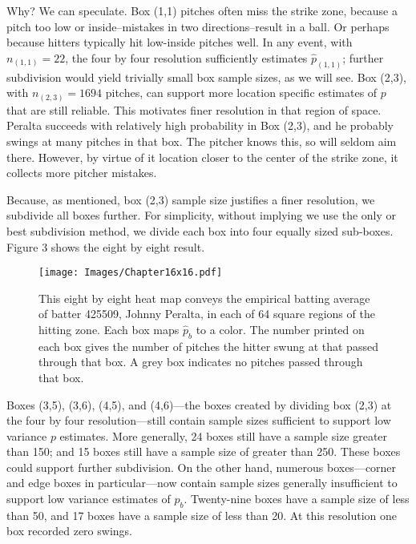 Why? We can speculate. Box (1,1) pitches often miss the strike zone, because a pitch too low or inside--mistakes in two directions--result in a ball. Or perhaps because hitters typically hit low-inside pitches well. In any event, with $n_{(1,1)}=22$, the four by four resolution sufficiently estimates $\hat{p}_{(1,1)}$; further subdivision would yield trivially small box sample sizes, as we will see. Box (2,3), with $n_{(2,3)} = 1694$ pitches, can support more location specific estimates of $p$ that are still reliable. This motivates finer resolution in that region of space. Peralta succeeds with relatively high probability in Box (2,3), and he probably swings at many pitches in that box. The pitcher knows this, so will seldom aim there. However, by virtue of it location closer to the center of the strike zone, it collects more pitcher mistakes.

Because, as mentioned, box (2,3) sample size justifies a finer resolution, we subdivide all boxes further. For simplicity, without implying we use the only or best subdivision method, we divide each box into four equally sized sub-boxes. Figure 3 shows the eight by eight result.
        \begin{figure}[H]
      	\centering
      	\texttt{[image: Images/Chapter16x16.pdf]} 
      	\caption{This eight by eight heat map conveys the empirical batting average of batter 425509, Johnny Peralta, in each of 64 square regions of the hitting zone. Each box maps $\hat{p}_{b}$ to a color. The number printed on each box gives the number of pitches the hitter swung at that passed through that box. A grey box indicates no pitches passed through that box.}
      	\end{figure} 

Boxes (3,5), (3,6), (4,5), and (4,6)---the boxes created by dividing box (2,3) at the four by four resolution---still contain sample sizes sufficient to support low variance $p$ estimates. More generally, 24 boxes still have a sample size greater than 150; and 15 boxes still have a sample size of greater than 250. These boxes could support further subdivision. On the other hand, numerous boxes---corner and edge boxes in particular---now contain sample sizes generally insufficient to support low variance estimates of $p_{b}$. Twenty-nine boxes have a sample size of less than 50, and 17 boxes have a sample size of less than 20. At this resolution one box recorded zero swings.

